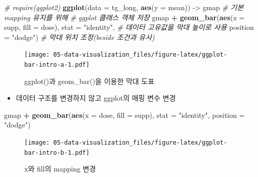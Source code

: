 \documentclass[
  11pt,
]{krantz}
\newenvironment{Shaded}{\begin{snugshade}}{\end{snugshade}}
\newcommand{\CommentTok}[1]{\textcolor[rgb]{0.37,0.37,0.37}{\textit{#1}}}
\newcommand{\DataTypeTok}[1]{\textcolor[rgb]{0.27,0.27,0.27}{#1}}
\newcommand{\KeywordTok}[1]{\textcolor[rgb]{0.27,0.27,0.27}{\textbf{#1}}}
\newcommand{\NormalTok}[1]{#1}
\newcommand{\OperatorTok}[1]{\textcolor[rgb]{0.43,0.43,0.43}{\textbf{#1}}}
\newcommand{\StringTok}[1]{\textcolor[rgb]{0.5,0.5,0.5}{#1}}
\providecommand{\tightlist}{%
  \setlength{\itemsep}{0pt}\setlength{\parskip}{0pt}}
\begin{document}
\footnotesize

\begin{Shaded}
\begin{Highlighting}[]
\CommentTok{# require(ggplot2)}
\KeywordTok{ggplot}\NormalTok{(}\DataTypeTok{data =}\NormalTok{ tg_long, }
       \KeywordTok{aes}\NormalTok{(}\DataTypeTok{y =}\NormalTok{ mean)) ->}\StringTok{ }\NormalTok{gmap }\CommentTok{# 기본 mapping 유지를 위해 }
                              \CommentTok{# ggplot 클래스 객체 저장}
\NormalTok{gmap }\OperatorTok{+}\StringTok{ }
\StringTok{  }\KeywordTok{geom_bar}\NormalTok{(}\KeywordTok{aes}\NormalTok{(}\DataTypeTok{x =}\NormalTok{ supp, }\DataTypeTok{fill =}\NormalTok{ dose), }
           \DataTypeTok{stat =} \StringTok{"identity"}\NormalTok{, }\CommentTok{# 데이터 고유값을 막대 높이로 사용}
           \DataTypeTok{position =} \StringTok{"dodge"}\NormalTok{) }\CommentTok{# 막대 위치 조정(beside 조건과 유사)}
\end{Highlighting}
\end{Shaded}

\begin{figure}
\centering
\texttt{[image: 05-data-visualization\_files/figure-latex/ggplot-bar-intro-a-1.pdf]}
\caption{\label{fig:ggplot-bar-intro-a}ggplot()과 geom\_bar()을 이용한 막대 도표}
\end{figure}

\normalsize

\begin{itemize}
\tightlist
\item
  데이터 구조를 변경하지 않고 ggplot의 매핑 변수 변경
\end{itemize}

\footnotesize

\begin{Shaded}
\begin{Highlighting}[]
\NormalTok{gmap }\OperatorTok{+}\StringTok{ }
\StringTok{  }\KeywordTok{geom_bar}\NormalTok{(}\KeywordTok{aes}\NormalTok{(}\DataTypeTok{x =}\NormalTok{ dose, }\DataTypeTok{fill =}\NormalTok{ supp), }
           \DataTypeTok{stat =} \StringTok{"identity"}\NormalTok{, }
           \DataTypeTok{position =} \StringTok{"dodge"}\NormalTok{)}
\end{Highlighting}
\end{Shaded}

\begin{figure}
\centering
\texttt{[image: 05-data-visualization\_files/figure-latex/ggplot-bar-intro-b-1.pdf]}
\caption{\label{fig:ggplot-bar-intro-b}x와 fill의 mapping 변경}
\end{figure}
\end{document}

